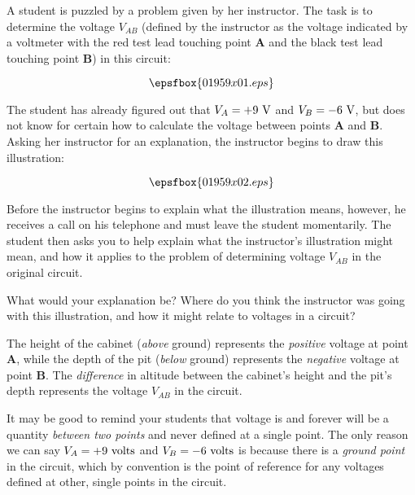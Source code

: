 

A student is puzzled by a problem given by her instructor.  The task is to determine the voltage $V_{AB}$ (defined by the instructor as the voltage indicated by a voltmeter with the red test lead touching point {\bf A} and the black test lead touching point {\bf B}) in this circuit:

$$\epsfbox{01959x01.eps}$$

The student has already figured out that $V_A = +9 \hbox{ V}$ and $V_B = -6 \hbox{ V}$, but does not know for certain how to calculate the voltage between points {\bf A} and {\bf B}.  Asking her instructor for an explanation, the instructor begins to draw this illustration:

$$\epsfbox{01959x02.eps}$$

Before the instructor begins to explain what the illustration means, however, he receives a call on his telephone and must leave the student momentarily.  The student then asks you to help explain what the instructor's illustration might mean, and how it applies to the problem of determining voltage $V_{AB}$ in the original circuit.

What would your explanation be?  Where do you think the instructor was going with this illustration, and how it might relate to voltages in a circuit?







The height of the cabinet ({\it above} ground) represents the {\it positive} voltage at point {\bf A}, while the depth of the pit ({\it below} ground) represents the {\it negative} voltage at point {\bf B}.  The {\it difference} in altitude between the cabinet's height and the pit's depth represents the voltage $V_{AB}$ in the circuit.







It may be good to remind your students that voltage is and forever will be a quantity {\it between two points} and never defined at a single point.  The only reason we can say $V_A = +9 \hbox{ volts}$ and $V_B = -6 \hbox{ volts}$ is because there is a {\it ground point} in the circuit, which by convention is the point of reference for any voltages defined at other, single points in the circuit.




